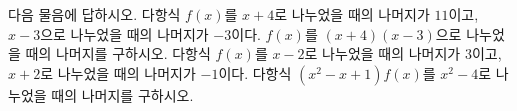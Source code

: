 다음 물음에 답하시오.
 다항식 $f(x)$를 $x+4$로 나누었을 때의 나머지가 $11$이고, $x-3$으로 나누었을 때의 나머지가 $-3$이다. $f(x)$를 $(x+4)(x-3)$으로 나누었을 때의 나머지를 구하시오.
 다항식 $f(x)$를 $x-2$로 나누었을 때의 나머지가 $3$이고, $x+2$로 나누었을 때의 나머지가 $-1$이다. 다항식 $(x^2-x+1)f(x)$를 $x^2-4$로 나누었을 때의 나머지를 구하시오.
